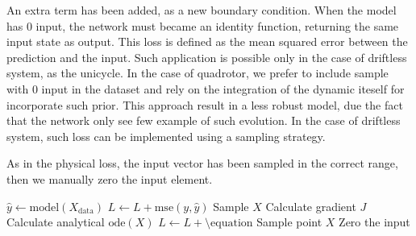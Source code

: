 An extra term has been added, as a new boundary condition. When the model has 0 input, the network must became an identity function, returning the same input state as output. 
This loss is defined as the mean squared error between the prediction and the input. Such application is possible only in the case of driftless system, as the unicycle. 
In the case of quadrotor, we prefer to include sample with 0 input in the dataset and rely on the integration of the dynamic iteself for incorporate such prior. 
This approach result in a less robust model, due the fact that the network only see few example of such evolution. In the case of driftless system, such loss can be implemented using a sampling strategy.

As in the physical loss, the input vector has been sampled in the correct range, then we manually zero the input element. 



\begin{algorithm}
    \caption{Pseudocode Representation}
    \begin{algorithmic}[1]
    \State $\hat{y} \gets \text{model}(X_{\text{data}})$
    \State $L \gets L + \text{mse}(y, \hat{y})$
    \State Sample $X$
    \State Calculate gradient $J$
    \State Calculate analytical $\text{ode}(X)$
    \State $L \gets L + \text{\textbackslash equation}$
    \State Sample point $X$
    \State Zero the input
    \end{algorithmic}
    \end{algorithm}
